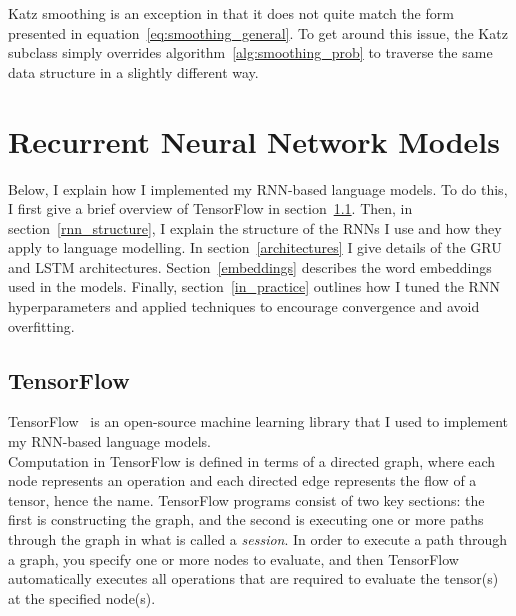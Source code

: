\documentclass[a4paper, 12pt]{report}
\newcommand{\tit}[1]{\textit{#1}}
\begin{document}
Katz smoothing is an exception in that it does not quite match the form presented in equation~\ref{eq:smoothing_general}. To get around this issue, the Katz subclass simply overrides algorithm~\ref{alg:smoothing_prob} to traverse the same data structure in a slightly different way.

\section{Recurrent Neural Network Models} \label{rnn_lm}

Below, I explain how I implemented my RNN-based language models. To do this, I first give a brief overview of TensorFlow in section~\ref{tensorflow}. Then, in section~\ref{rnn_structure}, I explain the structure of the RNNs I use and how they apply to language modelling. In section~\ref{architectures} I give details of the GRU and LSTM architectures. Section~\ref{embeddings} describes the word embeddings used in the models. Finally, section~\ref{in_practice} outlines how I tuned the RNN hyperparameters and applied techniques to encourage convergence and avoid overfitting.

\subsection{TensorFlow} \label{tensorflow}

TensorFlow~\cite{tensorflow:abadi2016} is an open-source machine learning library that I used to implement my RNN-based language models. \\

Computation in TensorFlow is defined in terms of a directed graph, where each node represents an operation and each directed edge represents the flow of a tensor, hence the name. TensorFlow programs consist of two key sections: the first is constructing the graph, and the second is executing one or more paths through the graph in what is called a \tit{session}. In order to execute a path through a graph, you specify one or more nodes to evaluate, and then TensorFlow automatically executes all operations that are required to evaluate the tensor(s) at the specified node(s). \\
\end{document}
